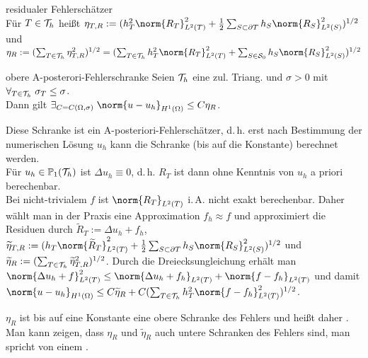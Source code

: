 \begin{Def}{residualer Fehlerschätzer}\\
    Für $T \in \mathcal{T}_h$ heißt
    $\eta_{T,R} := (h_T^2 \norm{R_T}_{L^2(T)}^2 +
    \frac{1}{2} \sum_{S \subset \partial T} h_S \norm{R_S}_{L^2(S)}^2)^{1/2}$
     und\\
    $\eta_R := (\sum_{T \in \T_h} \eta_{T,R}^2)^{1/2}
    = (\sum_{T \in \T_h} h_T^2 \norm{R_T}_{L^2(T)}^2 +
    \sum_{S \in \S_0} h_S \norm{R_S}_{L^2(S)}^2)^{1/2}$
\end{Def}

\linie

\begin{Satz}{obere A-posterori-Fehlerschranke}
    Seien $\mathcal{T}_h$ eine zul. Triang. und $\sigma > 0$ mit
    $\forall_{T \in \mathcal{T}_h}\; \sigma_T \le \sigma$.\\
    Dann gilt $\exists_{C = C(\Omega, \sigma)}\;
    \norm{u - u_h}_{H^1(\Omega)} \le C\eta_R$.
\end{Satz}

\begin{Bem}
    Diese Schranke ist ein A-posteriori-Fehlerschätzer, d.\,h. erst nach Bestimmung der
    numerischen Lösung $u_h$ kann die Schranke (bis auf die Konstante) berechnet werden.\\
    Für $u_h \in \mathbb{P}_1(\mathcal{T}_h)$ ist $\Delta u_h \equiv 0$, d.\,h.
    $R_T$ ist dann ohne Kenntnis von $u_h$ a priori berechenbar.\\
    Bei nicht-trivialem $f$ ist $\norm{R_T}_{L^2(T)}$ i.\,A. nicht exakt berechenbar.
    Daher wählt man in der Praxis eine Approximation $f_h \approx f$ und
    approximiert die Residuen durch
    $\widetilde{R}_T := \Delta u_h + f_h$,
    $\widetilde{\eta}_{T,R} := (h_T \norm{\widetilde{R}_T}_{L^2(T)}^2 +
    \frac{1}{2} \sum_{S \subset \partial T} h_S \norm{R_S}_{L^2(S)}^2)^{1/2}$ und
    $\widetilde{\eta}_R := (\sum_{T \in \mathcal{T}_h} \widetilde{\eta}_{T,R}^2)^{1/2}$.
    Durch die Dreiecksungleichung erhält man
    $\norm{\Delta u_h + f}_{L^2(T)}^2 \le
    \norm{\Delta u_h + f_h}_{L^2(T)} + \norm{f - f_h}_{L^2(T)}$
    und damit
    $\norm{u - u_h}_{H^1(\Omega)} \le C\widetilde{\eta}_R +
    C (\sum_{T \in \T_h} h_T^2 \norm{f - f_h}_{L^2(T)}^2)^{1/2}$.
\end{Bem}

\linie

\begin{Bem}
    $\eta_R$ ist bis auf eine Konstante eine obere Schranke des Fehlers und heißt daher
    .
    Man kann zeigen, dass $\eta_R$ und $\widetilde{\eta}_R$ auch untere Schranken des Fehlers
    sind, man spricht von einem .
\end{Bem}

